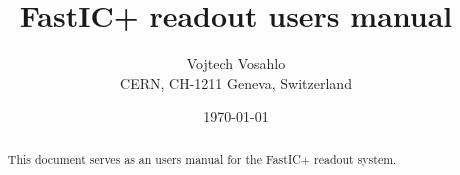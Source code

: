 \documentclass{cernatsnote}
\title{FastIC+ readout users manual}
\author{
	Vojtech Vosahlo \; \\		
	CERN, CH-1211 Geneva, Switzerland
}
\date{\today}
\begin{document}
\maketitle

\begin{abstract}
This document serves as an users manual for the FastIC+ readout system. 
\end{abstract}
\\ \\ \\ 

\newpage
\begingroup
\color{black}
\tableofcontents
\endgroup

\pagebreak
\end{document}
